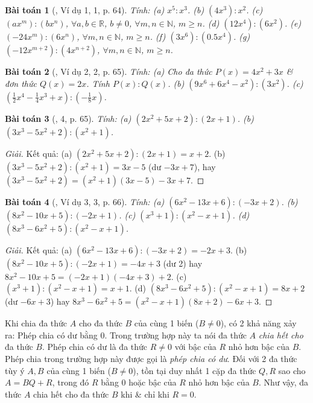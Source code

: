 \documentclass{article}
\newtheorem{baitoan}{Bài toán}
\begin{document}
\begin{baitoan}[\cite{SGK_Toan_7_Canh_Dieu_tap_2}, Ví dụ 1, 1, p. 64]
	Tính: (a) $x^5:x^3$. (b) $(4x^3):x^2$. (c) $(ax^m):(bx^n)$, $\forall a,b\in\mathbb{R}$, $b\ne0$, $\forall m,n\in\mathbb{N}$, $m\ge n$. (d) $(12x^4):(6x^2)$. (e) $(-24x^m):(6x^n)$, $\forall m,n\in\mathbb{N}$, $m\ge n$. (f) $(3x^6):(0.5x^4)$. (g) $(-12x^{m+2}):(4x^{n+2})$, $\forall m,n\in\mathbb{N}$, $m\ge n$.
\end{baitoan}

\begin{baitoan}[\cite{SGK_Toan_7_Canh_Dieu_tap_2}, Ví dụ 2, 2, p. 65]
	Tính: (a) Cho đa thức $P(x) = 4x^2 + 3x$ \& đơn thức $Q(x) = 2x$. Tính $P(x):Q(x)$. (b) $(9x^6 + 6x^4 - x^2):(3x^2)$. (c) $\left(\frac{1}{2}x^4 - \frac{1}{4}x^3 + x\right):\left(-\frac{1}{8}x\right)$.
\end{baitoan}

\begin{baitoan}[\cite{SGK_Toan_7_Canh_Dieu_tap_2}, 4, p. 65]
	Tính: (a) $(2x^2 + 5x + 2):(2x + 1)$. (b) $(3x^3 - 5x^2 + 2):(x^2 + 1)$.
\end{baitoan}

\begin{proof}[Giải]
	Kết quả: (a) $(2x^2 + 5x + 2):(2x + 1) = x + 2$. (b) $(3x^3 - 5x^2 + 2):(x^2 + 1) = 3x - 5$ (dư $-3x + 7$), hay $(3x^3 - 5x^2 + 2) = (x^2 + 1)(3x - 5) - 3x + 7$.
\end{proof}

\begin{baitoan}[\cite{SGK_Toan_7_Canh_Dieu_tap_2}, Ví dụ 3, 3, p. 66]
	Tính: (a) $(6x^2 - 13x + 6):(-3x + 2)$. (b) $(8x^2 - 10x + 5):(-2x + 1)$. (c) $(x^3 + 1):(x^2 - x + 1)$. (d) $(8x^3 - 6x^2 + 5):(x^2 - x + 1)$.
\end{baitoan}

\begin{proof}[Giải]
	Kết quả: (a) $(6x^2 - 13x + 6):(-3x + 2) = -2x + 3$. (b) $(8x^2 - 10x + 5):(-2x + 1) = -4x + 3$ (dư 2) hay $8x^2 - 10x + 5 = (-2x + 1)(-4x + 3) + 2$. (c) $(x^3 + 1):(x^2 - x + 1) = x + 1$. (d) $(8x^3 - 6x^2 + 5):(x^2 - x + 1) = 8x + 2$ (dư $-6x + 3$) hay $8x^3 - 6x^2 + 5 = (x^2 - x + 1)(8x + 2) - 6x + 3$.
\end{proof}
Khi chia đa thức $A$ cho đa thức $B$ của cùng 1 biến ($B\ne0$), có 2 khả năng xảy ra: Phép chia có dư bằng $0$. Trong trường hợp này ta nói đa thức $A$ \textit{chia hết cho} đa thức $B$. Phép chia có dư là đa thức $R\ne0$ với bậc của $R$ nhỏ hơn bậc của $B$. Phép chia trong trường hợp này được gọi là \textit{phép chia có dư}. Đối với 2 đa thức tùy ý $A,B$ của cùng 1 biến ($B\ne0$), tồn tại duy nhất 1 cặp đa thức $Q,R$ sao cho $A = BQ + R$, trong đó $R$ bằng $0$ hoặc bậc của $R$ nhỏ hơn bậc của $B$. Như vậy, đa thức $A$ chia hết cho đa thức $B$ khi \& chỉ khi $R = 0$.
\end{document}
